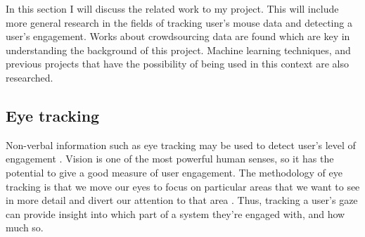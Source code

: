 \documentclass{article}
\begin{document}


In this section I will discuss the related work to my project.
This will include more general research in the fields of tracking user's mouse data and detecting a user's engagement.
Works about crowdsourcing data are found which are key in understanding the background of this project.
Machine learning techniques, and previous projects that have the possibility of being used in this context are also researched.



\subsection{Eye tracking}

Non-verbal information such as eye tracking may be used to detect user's level of engagement \cite{lala2017detection}.
Vision is one of the most powerful human senses, so it has the potential to give a good measure of user engagement. 
The methodology of eye tracking is that we move our eyes to focus on particular areas that we want to see in more detail and divert our attention to that area \cite{duchowski2007eye}. 
Thus, tracking a user's gaze can provide insight into which part of a system they're engaged with, and how much so.
\end{document}
